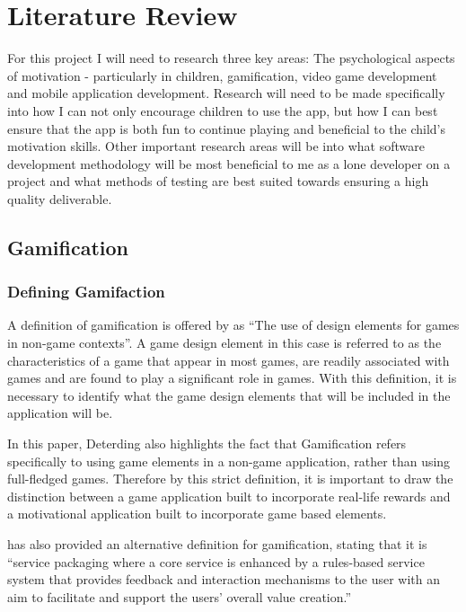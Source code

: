 \chapter{Literature Review}
\label{chap:litReview}

For this project I will need to research three key areas: The psychological aspects of motivation - particularly in children, gamification, video game development and mobile application development.
Research will need to be made specifically into how I can not only encourage children to use the app, but how I can best ensure that the app is both fun to continue playing and beneficial to the child's motivation skills.
Other important research areas will be into what software development methodology will be most beneficial to me as a lone developer on a project and what methods of testing are best suited towards ensuring a high quality deliverable.

\section{Gamification}
\subsection{Defining Gamifaction}
A definition of gamification is offered by \cite{Deterding:2011:GDE:2181037.2181040} as ``The use of design elements for games in non-game contexts''. 
A game design element in this case is referred to as the characteristics of a game that appear in most games, are readily associated with games and are found to play a significant role in games.
With this definition, it is necessary to identify what the game design elements that will be included in the application will be. 

In this paper, Deterding also highlights the fact that Gamification refers specifically to using game elements in a non-game application, rather than using full-fledged games.
Therefore by this strict definition, it is important to draw the distinction between a game application built to incorporate real-life rewards and a motivational application built to incorporate game based elements.

\cite{huotari2011gamification} has also provided an alternative definition for gamification, stating that it is ``service packaging where a core service is enhanced by a rules-based service system that provides feedback and interaction mechanisms to the user with an aim to facilitate and support the users’ overall value creation.''

